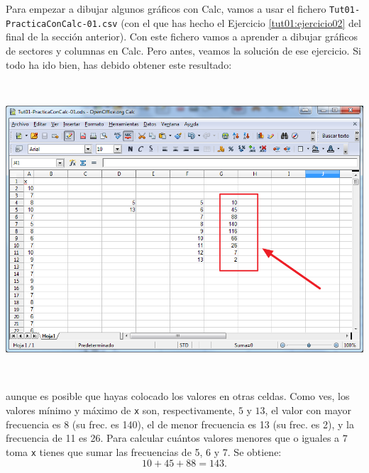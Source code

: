 \documentclass[10pt,a4paper]{article}\usepackage[]{graphicx}\usepackage[]{color}
\begin{document}
Para empezar a dibujar algunos gráficos con Calc, vamos a usar el fichero {\tt Tut01-PracticaConCalc-01.csv} (con el que has hecho el Ejercicio \ref{tut01:ejercicio02} del final de la sección anterior). Con este fichero vamos a aprender a dibujar gráficos de sectores y columnas en Calc. Pero antes, veamos la solución de ese ejercicio. Si todo ha ido bien, has debido obtener este resultado:
    \begin{center}
    \includegraphics[height=11cm]{../fig/Tut01-Calc-Graficos-01.png}
    \end{center}
aunque es posible que hayas colocado los valores en otras celdas. Como ves, los valores mínimo y máximo de {\tt x} son, respectivamente, $5$ y $13$, el valor con mayor frecuencia es $8$ (su frec. es 140), el de menor frecuencia es 13 (su frec. es 2), y la frecuencia de 11 es 26. Para calcular cuántos valores menores que o iguales a $7$ toma {\tt x} tienes que sumar las frecuencias de 5,
6 y 7. Se obtiene:
\[10+45+88=143.\]
\end{document}
